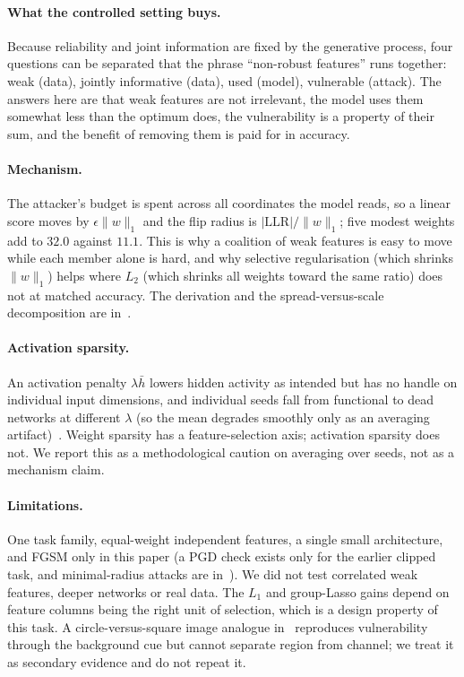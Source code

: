 \documentclass[11pt]{article}
\begin{document}
\paragraph{What the controlled setting buys.} Because reliability and joint information are fixed
by the generative process, four questions can be separated that the phrase ``non-robust
features'' runs together: weak (data), jointly informative (data), used (model), vulnerable (attack).
The answers here are that weak features are not irrelevant, the model uses them somewhat less than
the optimum does, the vulnerability is a property of their sum, and the benefit of removing them is paid for
in accuracy.

\paragraph{Mechanism.} The attacker's budget is spent across all coordinates the model reads, so a
linear score moves by $\epsilon\|w\|_1$ and the flip radius is $|\mathrm{LLR}|/\|w\|_1$; five modest weights
add to $32.0$ against $11.1$. This is why a coalition of weak features is easy to move while each
member alone is hard, and why selective regularisation (which shrinks $\|w\|_1$) helps where $L_2$
(which shrinks all weights toward the same ratio) does not at matched accuracy. The derivation and the
spread-versus-scale decomposition are in~\cite{rootcause}.

\paragraph{Activation sparsity.} An activation penalty $\lambda\bar h$ lowers hidden activity as
intended but has no handle on individual input dimensions, and individual seeds fall from
functional to dead networks at different $\lambda$ (so the mean degrades smoothly only as an
averaging artifact)~\cite{earlier}. Weight sparsity has a feature-selection axis; activation sparsity
does not. We report this as a methodological caution on averaging over seeds, not as a mechanism claim.

\paragraph{Limitations.} One task family, equal-weight independent features, a single small
architecture, and FGSM only in this paper (a PGD check exists only for the earlier clipped task, and minimal-radius
attacks are in~\cite{rootcause}).
We did not test correlated weak features, deeper networks or real data. The $L_1$ and group-Lasso gains
depend on feature columns being the right unit of selection, which is a design property of this task.
A circle-versus-square image analogue in~\cite{earlier} reproduces vulnerability through the
background cue but cannot separate region from channel; we treat it as secondary evidence and do not
repeat it.
\end{document}
